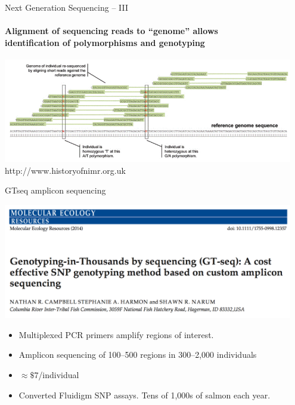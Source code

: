 \documentclass[letter,graphicx]{beamer}
\begin{document}
\begin{frame}{Next Generation Sequencing -- III}
\framesubtitle{Alignment of sequencing reads to ``genome'' allows \\
identification of polymorphisms and genotyping}
{\centering
\includegraphics[width=0.95\textwidth]{mhap_figs/alignment.png}
}\\
{\tiny http://www.historyofnimr.org.uk}
\end{frame}






\begin{frame}{GTseq amplicon sequencing}
\begin{center}
\includegraphics[width=0.95\textwidth]{figs/gtseq-header.png}
\end{center}
\begin{itemize}
\item Multiplexed PCR primers amplify regions of interest.
\item Amplicon sequencing of 100--500 regions in 300--2,000 individuals
\item $\approx \$7$/individual
\item Converted Fluidigm SNP assays.  Tens of 1,000s of salmon each year.
\end{itemize}
\end{frame}
\end{document}

